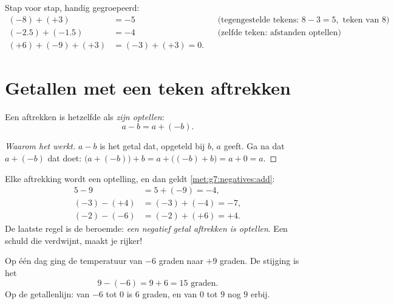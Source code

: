 \begin{example}\label{ex:g7:negatives:add}
Stap voor stap, handig gegroepeerd:
\begin{align*}
(-8) + (+3) &= -5 && \text{(tegengestelde tekens: } 8 - 3 = 5,
\text{ teken van } 8)\\
(-2.5) + (-1.5) &= -4 && \text{(zelfde teken: afstanden optellen)}\\
(+6) + (-9) + (+3) &= (-3) + (+3) = 0 .
\end{align*}
\end{example}

\section{Getallen met een teken aftrekken}

\begin{theorem}\label{thm:g7:negatives:sub}
Een  aftrekken is hetzelfde als \emph{zijn 
optellen}:
\[
a - b = a + (-b) .
\]
\end{theorem}

\begin{proof}[Waarom het werkt]
$a - b$ is het getal dat, opgeteld bij $b$, $a$ geeft. Ga na dat $a + (-b)$ dat
doet: $\bigl(a + (-b)\bigr) + b = a + \bigl((-b) + b\bigr) = a + 0 = a$.
\end{proof}

\begin{example}\label{ex:g7:negatives:sub}
Elke aftrekking wordt een optelling, en dan geldt
\cref{met:g7:negatives:add}:
\begin{align*}
5 - 9 &= 5 + (-9) = -4, \\
(-3) - (+4) &= (-3) + (-4) = -7, \\
(-2) - (-6) &= (-2) + (+6) = +4 .
\end{align*}
De laatste regel is de beroemde: \emph{een negatief getal aftrekken is
optellen}. Een schuld die verdwijnt, maakt je rijker!
\end{example}

\begin{example}[Temperatuurverschillen]\label{ex:g7:negatives:temperature}
Op één dag ging de temperatuur van $-6$ graden naar $+9$ graden. De stijging is
het 
\[
9 - (-6) = 9 + 6 = 15 \text{ graden}.
\]
Op de getallenlijn: van $-6$ tot $0$ is $6$ graden, en van $0$ tot $9$ nog $9$
erbij.
\end{example}

